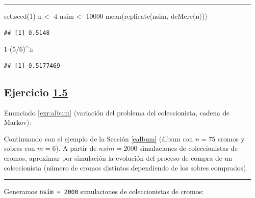 \documentclass[
]{book}
\newenvironment{Shaded}{\begin{snugshade}}{\end{snugshade}}
\newcommand{\DecValTok}[1]{\textcolor[rgb]{0.00,0.00,0.81}{#1}}
\newcommand{\FunctionTok}[1]{\textcolor[rgb]{0.00,0.00,0.00}{#1}}
\newcommand{\NormalTok}[1]{#1}
\newcommand{\OtherTok}[1]{\textcolor[rgb]{0.56,0.35,0.01}{#1}}
\newcommand{\SpecialCharTok}[1]{\textcolor[rgb]{0.00,0.00,0.00}{#1}}
\theoremstyle{break}
\theoremstyle{nonumberplain}
\begin{document}
\begin{center}\rule{0.5\linewidth}{0.5pt}\end{center}

\begin{Shaded}
\begin{Highlighting}[]
\FunctionTok{set.seed}\NormalTok{(}\DecValTok{1}\NormalTok{)}
\NormalTok{n }\OtherTok{\textless{}{-}} \DecValTok{4}
\NormalTok{nsim }\OtherTok{\textless{}{-}} \DecValTok{10000}
\FunctionTok{mean}\NormalTok{(}\FunctionTok{replicate}\NormalTok{(nsim, }\FunctionTok{deMere}\NormalTok{(n)))}
\end{Highlighting}
\end{Shaded}

\begin{verbatim}
## [1] 0.5148
\end{verbatim}

\begin{Shaded}
\begin{Highlighting}[]
\DecValTok{1}\SpecialCharTok{{-}}\NormalTok{(}\DecValTok{5}\SpecialCharTok{/}\DecValTok{6}\NormalTok{)}\SpecialCharTok{\^{}}\NormalTok{n}
\end{Highlighting}
\end{Shaded}

\begin{verbatim}
## [1] 0.5177469
\end{verbatim}

\hypertarget{sol-album}{%
\subsection{\texorpdfstring{Ejercicio \href{ejercicios.html\#exr:album}{1.5}}{Ejercicio 1.5}}\label{sol-album}}

Enunciado \ref{exr:album} (variación del problema del coleccionista, cadena de Markov):

Continuando con el ejemplo de la Sección \ref{ealbum}
(álbum con \(n = 75\) cromos y sobres con \(m = 6\)). A partir de \(nsim=2000\) simulaciones de coleccionistas de cromos, aproximar por simulación la evolución del proceso de compra de un coleccionista (número de cromos distintos dependiendo de los sobres comprados).

\begin{center}\rule{0.5\linewidth}{0.5pt}\end{center}

Generamos \texttt{nsim\ =\ 2000} simulaciones de coleccionistas de cromos:
\end{document}
